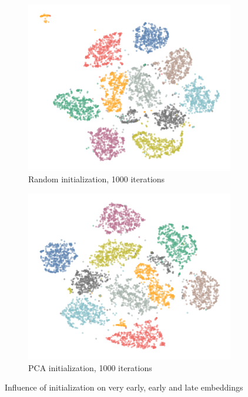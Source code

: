 \begin{figure}[tbp]
\begin{subfigure}{.45\linewidth}
  \end{subfigure}
  \par\bigskip
  \begin{subfigure}{.45\linewidth}
    \centering
    \includegraphics[width=\linewidth]{img/random_1000_iters-1}
    \caption{Random initialization, 1000 iterations}
  \end{subfigure}
  \begin{subfigure}{.45\linewidth}
    \centering
    \includegraphics[width=\linewidth]{img/pca_1000_iters-1}
    \caption{PCA initialization, 1000 iterations}
  \end{subfigure}
  \caption{Influence of initialization on very early, early and late embeddings}
  \label{fig:pca-random}
\end{figure}

